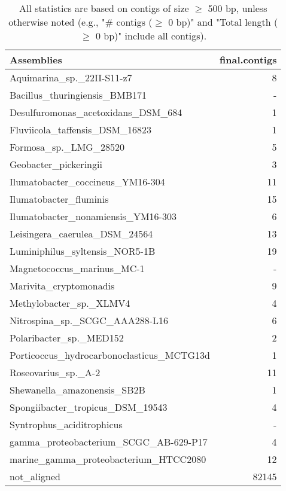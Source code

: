 \documentclass[12pt,a4paper]{article}
\begin{document}
\begin{table}[ht]
\begin{center}
\caption{All statistics are based on contigs of size $\geq$ 500 bp, unless otherwise noted (e.g., "\# contigs ($\geq$ 0 bp)" and "Total length ($\geq$ 0 bp)" include all contigs).}
\begin{tabular}{|l*{1}{|r}|}
\hline
Assemblies & final.contigs \\ \hline
Aquimarina\_sp.\_22II-S11-z7 & 8 \\ \hline
Bacillus\_thuringiensis\_BMB171 & - \\ \hline
Desulfuromonas\_acetoxidans\_DSM\_684 & 1 \\ \hline
Fluviicola\_taffensis\_DSM\_16823 & 1 \\ \hline
Formosa\_sp.\_LMG\_28520 & 5 \\ \hline
Geobacter\_pickeringii & 3 \\ \hline
Ilumatobacter\_coccineus\_YM16-304 & 11 \\ \hline
Ilumatobacter\_fluminis & 15 \\ \hline
Ilumatobacter\_nonamiensis\_YM16-303 & 6 \\ \hline
Leisingera\_caerulea\_DSM\_24564 & 13 \\ \hline
Luminiphilus\_syltensis\_NOR5-1B & 19 \\ \hline
Magnetococcus\_marinus\_MC-1 & - \\ \hline
Marivita\_cryptomonadis & 9 \\ \hline
Methylobacter\_sp.\_XLMV4 & 4 \\ \hline
Nitrospina\_sp.\_SCGC\_AAA288-L16 & 6 \\ \hline
Polaribacter\_sp.\_MED152 & 2 \\ \hline
Porticoccus\_hydrocarbonoclasticus\_MCTG13d & 1 \\ \hline
Roseovarius\_sp.\_A-2 & 11 \\ \hline
Shewanella\_amazonensis\_SB2B & 1 \\ \hline
Spongiibacter\_tropicus\_DSM\_19543 & 4 \\ \hline
Syntrophus\_aciditrophicus & - \\ \hline
gamma\_proteobacterium\_SCGC\_AB-629-P17 & 4 \\ \hline
marine\_gamma\_proteobacterium\_HTCC2080 & 12 \\ \hline
not\_aligned & 82145 \\ \hline
\end{tabular}
\end{center}
\end{table}
\end{document}

